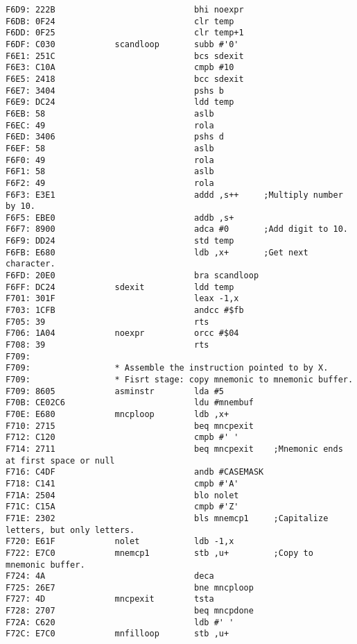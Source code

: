 {\begin{verbatim}
F6D9: 222B                            bhi noexpr
F6DB: 0F24                            clr temp
F6DD: 0F25                            clr temp+1
F6DF: C030            scandloop       subb #'0'
F6E1: 251C                            bcs sdexit                              
F6E3: C10A                            cmpb #10
F6E5: 2418                            bcc sdexit
F6E7: 3404                            pshs b
F6E9: DC24                            ldd temp
F6EB: 58                              aslb
F6EC: 49                              rola
F6ED: 3406                            pshs d
F6EF: 58                              aslb
F6F0: 49                              rola
F6F1: 58                              aslb
F6F2: 49                              rola
F6F3: E3E1                            addd ,s++     ;Multiply number by 10.
F6F5: EBE0                            addb ,s+
F6F7: 8900                            adca #0       ;Add digit to 10.
F6F9: DD24                            std temp        
F6FB: E680                            ldb ,x+       ;Get next character.
F6FD: 20E0                            bra scandloop
F6FF: DC24            sdexit          ldd temp
F701: 301F                            leax -1,x
F703: 1CFB                            andcc #$fb      
F705: 39                              rts                     
F706: 1A04            noexpr          orcc #$04
F708: 39                              rts     
F709:                 
F709:                 * Assemble the instruction pointed to by X.
F709:                 * Fisrt stage: copy mnemonic to mnemonic buffer.
F709: 8605            asminstr        lda #5
F70B: CE02C6                          ldu #mnembuf
F70E: E680            mncploop        ldb ,x+         
F710: 2715                            beq mncpexit
F712: C120                            cmpb #' '
F714: 2711                            beq mncpexit    ;Mnemonic ends at first space or null
F716: C4DF                            andb #CASEMASK
F718: C141                            cmpb #'A'
F71A: 2504                            blo nolet
F71C: C15A                            cmpb #'Z'
F71E: 2302                            bls mnemcp1     ;Capitalize letters, but only letters.
F720: E61F            nolet           ldb -1,x
F722: E7C0            mnemcp1         stb ,u+         ;Copy to mnemonic buffer.
F724: 4A                              deca
F725: 26E7                            bne mncploop
F727: 4D              mncpexit        tsta
F728: 2707                            beq mncpdone
F72A: C620                            ldb #' '
F72C: E7C0            mnfilloop       stb ,u+

\end{verbatim}}
